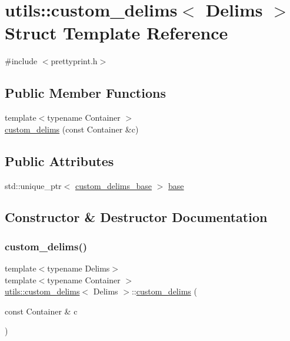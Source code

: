 \hypertarget{structutils_1_1custom__delims}{}\section{utils\+::custom\+\_\+delims$<$ Delims $>$ Struct Template Reference}
\label{structutils_1_1custom__delims}


{\ttfamily \#include $<$prettyprint.\+h$>$}

\subsection*{Public Member Functions}
\begin{DoxyCompactItemize}
\item 
{\footnotesize template$<$typename Container $>$ }\\\mbox{\hyperlink{structutils_1_1custom__delims_abf93a66f60eaa8766aad7ea0e6ffb4ad}{custom\+\_\+delims}} (const Container \&c)
\end{DoxyCompactItemize}
\subsection*{Public Attributes}
\begin{DoxyCompactItemize}
\item 
std\+::unique\+\_\+ptr$<$ \mbox{\hyperlink{structutils_1_1custom__delims__base}{custom\+\_\+delims\+\_\+base}} $>$ \mbox{\hyperlink{structutils_1_1custom__delims_ad5ba1984e29c022e1e7b76f60c41b109}{base}}
\end{DoxyCompactItemize}


\subsection{Constructor \& Destructor Documentation}
\mbox{\label{structutils_1_1custom__delims_abf93a66f60eaa8766aad7ea0e6ffb4ad}} 
\subsubsection{\texorpdfstring{custom\_delims()}{custom\_delims()}}
{\footnotesize\ttfamily template$<$typename Delims$>$ \\
template$<$typename Container $>$ \\
\mbox{\hyperlink{structutils_1_1custom__delims}{utils\+::custom\+\_\+delims}}$<$ Delims $>$\+::\mbox{\hyperlink{structutils_1_1custom__delims}{custom\+\_\+delims}} (\begin{DoxyParamCaption}\item[{const Container \&}]{c }\end{DoxyParamCaption})\hspace{0.3cm}{\ttfamily [inline]}}



